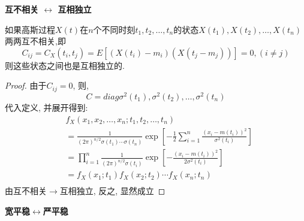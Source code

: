 \documentclass{article}
\begin{document}
\textbf{互不相关 $\leftrightarrow$ 互相独立}
\begin{theorem}
如果高斯过程$X(t)$在$n$个不同时刻$t_1, t_2, \ldots, t_n$的状态$X(t_1), X(t_2), \ldots, X(t_n)$两两互不相关,即
$$
C_{ij} = C_X(t_i, t_j) = E[(X(t_i) - m_i)(X(t_j - m_j))] = 0, (i \neq j)
$$
则这些状态之间也是互相独立的.
\end{theorem}
\begin{proof}
由于$C_{ij} = 0$, 则, 
$$ C = diag{\sigma^2(t_1), \sigma^2(t_2), \ldots, \sigma^2(t_n)}$$
代入定义, 并展开得到:
$$
\begin{aligned}
& f_X(x_1, x_2, \ldots, x_n; t_1, t_2, \ldots, t_n) \\
& = \frac{1}{(2\pi)^{n/2} \sigma(t_1) \cdots \sigma(t_n)} \exp[-\frac{1}{2} \sum_{i=1}^n \frac{(x_i - m(t_i))^2}{\sigma^2(t_i)}]\\
& = \prod_{i=1}^n \frac{1}{(2\pi)^{n/2} \sigma(t_i)} \exp[-\frac{(x_i - m(t_i))^2}{2 \sigma^2(t_i)}]\\
& = f_X(x_1; t_1) f_X(x_2; t_2) \cdots f_X(x_n; t_n)\\
\end{aligned}
$$
由互不相关$\rightarrow$互相独立, 反之, 显然成立
\end{proof}

\textbf{宽平稳$\leftrightarrow$严平稳}
\begin{theorem}
\end{theorem}
\end{document}
